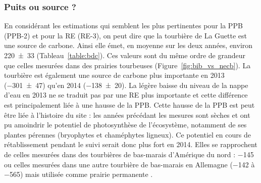 \subsubsection{Puits ou source ?}

En considérant les estimations qui semblent les plus pertinentes pour la PPB (PPB-2) et pour la RE (RE-3), on peut dire que la tourbière de La Guette est une source de carbone.
Ainsi elle émet, en moyenne sur les deux années, environ \SI{220(33)}{\gcma} (Tableau~\ref{table:bdc}).
Ces valeurs sont du même ordre de grandeur que celles mesurées dans des prairies tourbeuses (Figure~\ref{fig:bib_vs_necb}).
La tourbière est également une source de carbone plus importante en 2013 (\SI{-301(47)}{\gcma}) qu'en 2014 (\SI{-138(20)}{\gcma}).
La légère baisse du niveau de la nappe d'eau en 2013 ne se traduit pas par une RE plus importante et cette différence est principalement liée à une hausse de la PPB.
Cette hausse de la PPB est peut être liée à l'histoire du site : les années précédant les mesures sont sèches et ont pu amoindrir le potentiel de photosynthèse de l'écosystème, notamment de ses plantes pérennes (bryophytes et chaméphytes ligneux).
Ce potentiel en cours de rétablissement pendant le suivi serait donc plus fort en 2014.
Elles se rapprochent de celles mesurées dans des tourbières de bas-marais d'Amérique du nord : \SI{-145}{\gcma} \citep{carroll1997} ou celles mesurées dans une autre tourbière de bas-marais en Allemagne (\num{-142} à \SI{-565}{\gcma}) mais utilisée comme prairie permanente \citep{beyer2015}.


